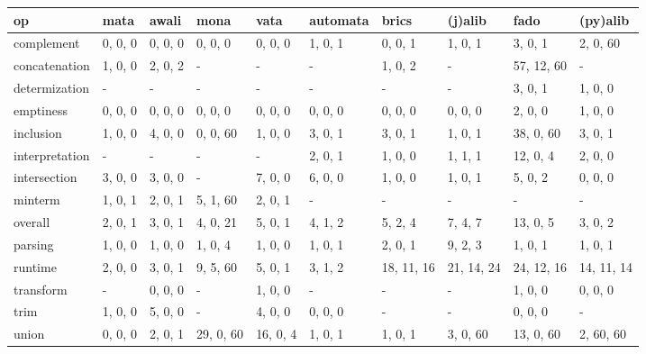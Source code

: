 \begin{tabular}{llllllllll}
\hline
 op             & mata    & awali   & mona      & vata     & automata   & brics      & (j)alib    & fado       & (py)alib   \\
\hline
 complement     & 0, 0, 0 & 0, 0, 0 & 0, 0, 0   & 0, 0, 0  & 1, 0, 1    & 0, 0, 1    & 1, 0, 1    & 3, 0, 1    & 2, 0, 60   \\
 concatenation  & 1, 0, 0 & 2, 0, 2 & -         & -        & -          & 1, 0, 2    & -          & 57, 12, 60 & -          \\
 determization  & -       & -       & -         & -        & -          & -          & -          & 3, 0, 1    & 1, 0, 0    \\
 emptiness      & 0, 0, 0 & 0, 0, 0 & 0, 0, 0   & 0, 0, 0  & 0, 0, 0    & 0, 0, 0    & 0, 0, 0    & 2, 0, 0    & 1, 0, 0    \\
 inclusion      & 1, 0, 0 & 4, 0, 0 & 0, 0, 60  & 1, 0, 0  & 3, 0, 1    & 3, 0, 1    & 1, 0, 1    & 38, 0, 60  & 3, 0, 1    \\
 interpretation & -       & -       & -         & -        & 2, 0, 1    & 1, 0, 0    & 1, 1, 1    & 12, 0, 4   & 2, 0, 0    \\
 intersection   & 3, 0, 0 & 3, 0, 0 & -         & 7, 0, 0  & 6, 0, 0    & 1, 0, 0    & 1, 0, 1    & 5, 0, 2    & 0, 0, 0    \\
 minterm        & 1, 0, 1 & 2, 0, 1 & 5, 1, 60  & 2, 0, 1  & -          & -          & -          & -          & -          \\
 overall        & 2, 0, 1 & 3, 0, 1 & 4, 0, 21  & 5, 0, 1  & 4, 1, 2    & 5, 2, 4    & 7, 4, 7    & 13, 0, 5   & 3, 0, 2    \\
 parsing        & 1, 0, 0 & 1, 0, 0 & 1, 0, 4   & 1, 0, 0  & 1, 0, 1    & 2, 0, 1    & 9, 2, 3    & 1, 0, 1    & 1, 0, 1    \\
 runtime        & 2, 0, 0 & 3, 0, 1 & 9, 5, 60  & 5, 0, 1  & 3, 1, 2    & 18, 11, 16 & 21, 14, 24 & 24, 12, 16 & 14, 11, 14 \\
 transform      & -       & 0, 0, 0 & -         & 1, 0, 0  & -          & -          & -          & 1, 0, 0    & 0, 0, 0    \\
 trim           & 1, 0, 0 & 5, 0, 0 & -         & 4, 0, 0  & 0, 0, 0    & -          & -          & 0, 0, 0    & -          \\
 union          & 0, 0, 0 & 2, 0, 1 & 29, 0, 60 & 16, 0, 4 & 1, 0, 1    & 1, 0, 1    & 3, 0, 60   & 13, 0, 60  & 2, 60, 60  \\
\hline
\end{tabular}